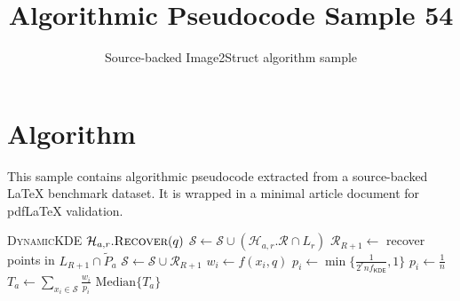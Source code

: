 \documentclass[11pt]{article}
\title{Algorithmic Pseudocode Sample 54}
\author{Source-backed Image2Struct algorithm sample}
\date{}
\begin{document}
\maketitle
\section{Algorithm}
This sample contains algorithmic pseudocode extracted from a source-backed LaTeX benchmark dataset. It is wrapped in a minimal article document for pdfLaTeX validation.

\begin{algorithm}[htbp]
\caption{Source-backed algorithmic procedure}
\begin{algorithm}[!ht]
\caption{Dynamic KDE, query part}\begin{algorithmic}[1]
 \textsc{DynamicKDE} 
\State
{}
  \State $\mathcal{H}_{a,r}.\textsc{Recover}(q)$ \State $\mathcal{S} \leftarrow \mathcal{S} \cup (\mathcal{H}_{a,r}.\mathcal{R}\cap L_r) $ \EndFor \State $\mathcal{R}_{R+1}\leftarrow$ recover points in $L_{R+1}\cap\tilde{P}_{a}$
\State $\mathcal{S} \leftarrow \mathcal{S}\cup\mathcal{R}_{R+1}$  \State $w_{i}\leftarrow f(x_{i},q)$
\State $p_{i}\leftarrow\min\{ \frac{1}{2^{r} n f_{\mathsf{KDE}} },1\}$
\State $p_{i}\leftarrow\frac{1}{n}$
\EndIf
\EndFor \State $T_{a}\leftarrow\sum_{x_{i}\in\mathcal{S}}\frac{w_i}{p_i}$ \EndFor
\State \Return $\mathrm{Median}\{T_{a}\}$
\EndProcedure
{}
\end{algorithmic}
\end{algorithm}
\end{algorithm}
\end{document}
